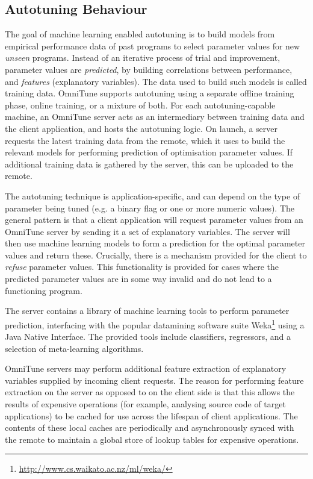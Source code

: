 \documentclass[nonatbib,preprint,9pt]{sigplanconf}
\begin{document}
\subsection{Autotuning Behaviour}

The goal of machine learning enabled autotuning is to build models
from empirical performance data of past programs to select parameter
values for new \emph{unseen} programs. Instead of an iterative process
of trial and improvement, parameter values are \emph{predicted}, by
building correlations between performance, and \emph{features}
(explanatory variables). The data used to build such models is called
training data. OmniTune supports autotuning using a separate offline
training phase, online training, or a mixture of both. For each
autotuning-capable machine, an OmniTune server acts as an intermediary
between training data and the client application, and hosts the
autotuning logic. On launch, a server requests the latest training
data from the remote, which it uses to build the relevant models for
performing prediction of optimisation parameter values. If additional
training data is gathered by the server, this can be uploaded to the
remote.

The autotuning technique is application-specific, and can depend on
the type of parameter being tuned (e.g. a binary flag or one or more
numeric values). The general pattern is that a client application will
request parameter values from an OmniTune server by sending it a set
of explanatory variables. The server will then use machine learning
models to form a prediction for the optimal parameter values and
return these. Crucially, there is a mechanism provided for the client
to \emph{refuse} parameter values. This functionality is provided for
cases where the predicted parameter values are in some way invalid and
do not lead to a functioning program. %

The server contains a library of machine learning tools to perform
parameter prediction, interfacing with the popular datamining software
suite Weka\footnote{\url{http://www.cs.waikato.ac.nz/ml/weka/}} using
a Java Native Interface. The provided tools include classifiers,
regressors, and a selection of meta-learning algorithms.

OmniTune servers may perform additional feature extraction of
explanatory variables supplied by incoming client requests. The reason
for performing feature extraction on the server as opposed to on the
client side is that this allows the results of expensive operations
(for example, analysing source code of target applications) to be
cached for use across the lifespan of client applications. The
contents of these local caches are periodically and asynchronously
synced with the remote to maintain a global store of lookup tables for
expensive operations.
\end{document}
